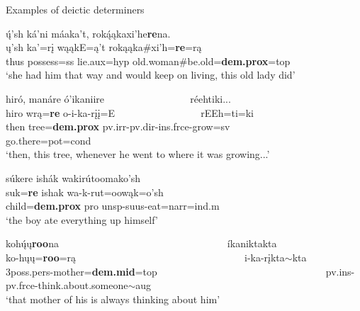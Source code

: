 \begin{exe}

\item\label{ExamplesOfDeicticDeterminers} Examples of deictic determiners

\begin{xlist}

\item\label{ExamplesOfDeicticDeterminers1} \glll ų́'sh ká'ni máaka't, roką́ąkaxi'he\textbf{re}na.\\
   ų'sh ka'=rį wąąkE=ą't rokąąka\#xi'h=\textbf{re}=rą\\
    \textnormal{thus} \textnormal{possess}=ss \textnormal{lie}.aux=hyp \textnormal{old.woman}\#\textnormal{be.old}=\textbf{dem.prox}=top\\
    \glt `she had him that way and would keep on living, this old lady did' \citep[88]{hollow1973a}
    
\item\label{ExamplesOfDeicticDeterminers2} \glll hiró, manáre ó'ikaniire ~ ~ ~ ~ ~ ~ ~ ~ ~ ~  réehtiki...\\
    hiro wrą=\textbf{re} o-i-ka-rįį=E ~ ~ ~ ~ ~ ~ ~ ~ ~ ~ rEEh=ti=ki\\
    \textnormal{then} \textnormal{tree}=\textbf{dem.prox} pv.irr-pv.dir-ins.frce-\textnormal{grow}=sv ~ ~ ~ ~ ~ ~ ~ ~ ~ ~ \textnormal{go.there}=pot=cond\\
    \glt `then, this tree, whenever he went to where it was growing...' \citep[99]{hollow1973a}
    
\item\label{ExamplesOfDeicticDeterminers3} \glll súkere ishák wakirútoomako'sh\\
    suk=\textbf{re} ishak wa-k-rut=oowąk=o'sh\\
    \textnormal{child}=\textbf{dem.prox} pro unsp-suus-\textnormal{eat}=narr=ind.m\\
    \glt `the boy ate everything up himself' \citep[189]{trechter2012}
    
\item\label{ExamplesOfDeicticDeterminers4} \glll kohų́ų\textbf{roo}na ~ ~ ~ ~ ~ ~ ~ ~ ~ ~ ~ ~ ~ ~ ~ ~ ~ ~ ~ ~  íkaniktakta\\
    ko-hųų=\textbf{roo}=rą ~ ~ ~ ~ ~ ~ ~ ~ ~ ~ ~ ~ ~ ~ ~ ~ ~ ~ ~ ~ i-ka-rįkta$\sim$kta\\
    3poss.pers-\textnormal{mother}=\textbf{dem.mid}=top ~ ~ ~ ~ ~ ~ ~ ~ ~ ~ ~ ~ ~ ~ ~ ~ ~ ~ ~ ~ pv.ins-pv.frce-\textnormal{think.about.someone}$\sim$aug\\
    \glt `that mother of his is always thinking about him' \citep[108]{hollow1973a}
    

\end{xlist}
\end{exe}
